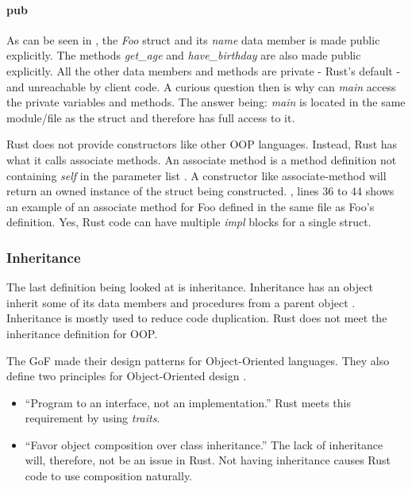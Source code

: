 \paragraph{pub}
As can be seen in , the \textit{Foo} struct and its \textit{name} data member is made public explicitly.
The methods \textit{get\_age} and \textit{have\_birthday} are also made public explicitly.
All the other data members and methods are private - Rust's default - and unreachable by client code.
A curious question then is why can \textit{main} access the private variables and methods.
The answer being: \textit{main} is located in the same module/file as the struct and therefore has full access to it.

\begin{notebox}
	Rust does not provide constructors like other OOP languages.
	Instead, Rust has what it calls associate methods.
	An associate method is a method definition not containing \textit{self} in the parameter list \cite{klabnik_2019_01}.
	A constructor like associate-method will return an owned instance of the struct being constructed.
	, lines 36 to 44 shows an example of an associate method for Foo defined in the same file as Foo's definition.
	Yes, Rust code can have multiple \textit{impl} blocks for a single struct.
\end{notebox}

\subsubsection{Inheritance}
The last definition being looked at is inheritance.
Inheritance has an object inherit some of its data members and procedures from a parent object \cite{meyer_97_01, stefik_85_01, gamma_94_01}.
Inheritance is mostly used to reduce code duplication.
Rust does not meet the inheritance definition for OOP.

The GoF made their design patterns for Object-Oriented languages.
They also define two principles for Object-Oriented design \cite{gamma_94_01}.
\begin{itemize}
	\item ``Program to an interface, not an implementation.''
	      Rust meets this requirement by using \textit{traits}.
	\item ``Favor object composition over class inheritance.''
	      The lack of inheritance will, therefore, not be an issue in Rust.
	      Not having inheritance causes Rust code to use composition naturally.
\end{itemize}

